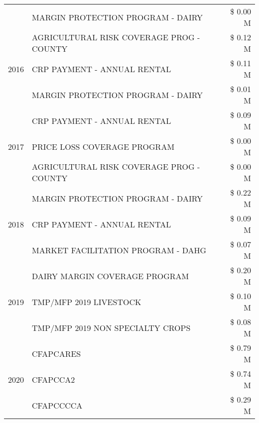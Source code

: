 \begin{tabular}{llr}
 & MARGIN PROTECTION PROGRAM - DAIRY & \$ 0.00 M \\
\cline{1-3}
\multirow[t]{3}{*}{2016} & AGRICULTURAL RISK COVERAGE PROG - COUNTY & \$ 0.12 M \\
 & CRP PAYMENT - ANNUAL RENTAL & \$ 0.11 M \\
 & MARGIN PROTECTION PROGRAM - DAIRY & \$ 0.01 M \\
\cline{1-3}
\multirow[t]{3}{*}{2017} & CRP PAYMENT - ANNUAL RENTAL & \$ 0.09 M \\
 & PRICE LOSS COVERAGE PROGRAM & \$ 0.00 M \\
 & AGRICULTURAL RISK COVERAGE PROG - COUNTY & \$ 0.00 M \\
\cline{1-3}
\multirow[t]{3}{*}{2018} & MARGIN PROTECTION PROGRAM - DAIRY & \$ 0.22 M \\
 & CRP PAYMENT - ANNUAL RENTAL & \$ 0.09 M \\
 & MARKET FACILITATION PROGRAM - DAHG & \$ 0.07 M \\
\cline{1-3}
\multirow[t]{3}{*}{2019} & DAIRY MARGIN COVERAGE PROGRAM & \$ 0.20 M \\
 & TMP/MFP 2019 LIVESTOCK & \$ 0.10 M \\
 & TMP/MFP 2019 NON SPECIALTY CROPS & \$ 0.08 M \\
\cline{1-3}
\multirow[t]{3}{*}{2020} & CFAPCARES & \$ 0.79 M \\
 & CFAPCCA2 & \$ 0.74 M \\
 & CFAPCCCCA & \$ 0.29 M \\
\cline{1-3}
\bottomrule
\end{tabular}
